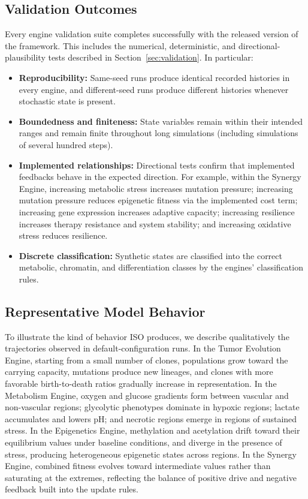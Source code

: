 \documentclass[12pt,a4paper]{article}
\begin{document}
\subsection{Validation Outcomes}

Every engine validation suite completes successfully with the released version of the framework. This includes the numerical, deterministic, and directional-plausibility tests described in Section~\ref{sec:validation}. In particular:

\begin{itemize}[leftmargin=*]
    \item \textbf{Reproducibility:} Same-seed runs produce identical recorded histories in every engine, and different-seed runs produce different histories whenever stochastic state is present.
    \item \textbf{Boundedness and finiteness:} State variables remain within their intended ranges and remain finite throughout long simulations (including simulations of several hundred steps).
    \item \textbf{Implemented relationships:} Directional tests confirm that implemented feedbacks behave in the expected direction. For example, within the Synergy Engine, increasing metabolic stress increases mutation pressure; increasing mutation pressure reduces epigenetic fitness via the implemented cost term; increasing gene expression increases adaptive capacity; increasing resilience increases therapy resistance and system stability; and increasing oxidative stress reduces resilience.
    \item \textbf{Discrete classification:} Synthetic states are classified into the correct metabolic, chromatin, and differentiation classes by the engines' classification rules.
\end{itemize}

\subsection{Representative Model Behavior}

To illustrate the kind of behavior ISO produces, we describe qualitatively the trajectories observed in default-configuration runs. In the Tumor Evolution Engine, starting from a small number of clones, populations grow toward the carrying capacity, mutations produce new lineages, and clones with more favorable birth-to-death ratios gradually increase in representation. In the Metabolism Engine, oxygen and glucose gradients form between vascular and non-vascular regions; glycolytic phenotypes dominate in hypoxic regions; lactate accumulates and lowers pH; and necrotic regions emerge in regions of sustained stress. In the Epigenetics Engine, methylation and acetylation drift toward their equilibrium values under baseline conditions, and diverge in the presence of stress, producing heterogeneous epigenetic states across regions. In the Synergy Engine, combined fitness evolves toward intermediate values rather than saturating at the extremes, reflecting the balance of positive drive and negative feedback built into the update rules.
\end{document}
